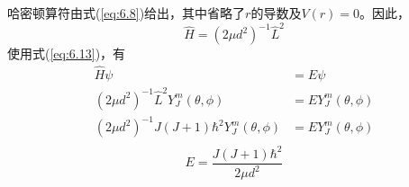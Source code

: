     哈密顿算符由式(\ref{eq:6.8})给出，其中省略了$r$的导数及$V\left(r\right) = 0$。因此，
    \begin{equation*}
        \hat{H} = \left(2\mu d^2\right)^{-1}\hat{L}^2
    \end{equation*}
    使用式(\ref{eq:6.13})，有
    \begin{equation*}
        \begin{aligned}
            \hat{H}\psi & = E\psi \\
            \left(2\mu d^2\right)^{-1}\hat{L}^2Y_J^m\left(\theta, \phi\right) & = EY_J^m\left(\theta, \phi\right) \\
            \left(2\mu d^2\right)^{-1}J\left(J+1\right)\hbar^2Y_J^m\left(\theta, \phi\right) & = EY_J^m\left(\theta, \phi\right) \\
        \end{aligned}
    \end{equation*}
    \begin{equation}
        E = \frac{J\left(J+1\right)\hbar^2}{2\mu d^2}
        \label{eq:6.47}
    \end{equation}

